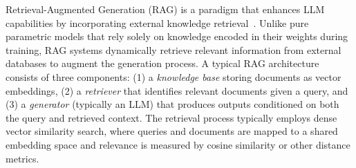 Retrieval-Augmented Generation (RAG) is a paradigm that enhances LLM capabilities by incorporating external knowledge retrieval~\cite{lewis2021retrievalaugmentedgenerationknowledgeintensivenlp}. Unlike pure parametric models that rely solely on knowledge encoded in their weights during training, RAG systems dynamically retrieve relevant information from external databases to augment the generation process.
A typical RAG architecture consists of three components: (1) a \textit{knowledge base} storing documents as vector embeddings, (2) a \textit{retriever} that identifies relevant documents given a query, and (3) a \textit{generator} (typically an LLM) that produces outputs conditioned on both the query and retrieved context. The retrieval process typically employs dense vector similarity search, where queries and documents are mapped to a shared embedding space and relevance is measured by cosine similarity or other distance metrics.
